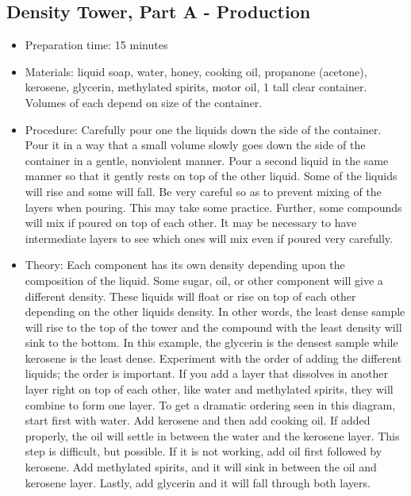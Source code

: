 \subsection{Density Tower, Part A - Production}
\begin{itemize}
\item{Preparation time: 15 minutes}
\item{Materials: liquid soap, water, honey, cooking oil, propanone (acetone), kerosene, glycerin, methylated spirits, motor oil, 1 tall clear container. Volumes of each depend on size of the container.}
\item{Procedure: Carefully pour one the liquids down the side of the container. Pour it in a way that a small volume slowly goes down the side of the container in a gentle, nonviolent manner. Pour a second liquid in the same manner so that it gently rests on top of the other liquid. Some of the liquids will rise and some will fall. Be very careful so as to prevent mixing of the layers when pouring. This may take some practice. Further, some compounds will mix if poured on top of each other. It may be necessary to have intermediate layers to see which ones will mix even if poured very carefully. }
\item{Theory: Each component has its own density depending upon the composition of the liquid. Some sugar, oil, or other component will give a different density. These liquids will float or rise on top of each other depending on the other liquids density. In other words, the least dense sample will rise to the top of the tower and the compound with the least density will sink to the bottom. In this example, the glycerin is the densest sample while kerosene is the least dense. Experiment with the order of adding the different liquids; the order is important. If you add a layer that dissolves in another layer right on top of each other, like water and methylated spirits, they will combine to form one layer. To get a dramatic ordering seen in this diagram, start first with water. Add kerosene and then add cooking oil. If added properly, the oil will settle in between the water and the kerosene layer. This step is difficult, but possible. If it is not working, add oil first followed by kerosene. Add methylated spirits, and it will sink in between the oil and kerosene layer. Lastly, add glycerin and it will fall through both layers.}
\end{itemize}

